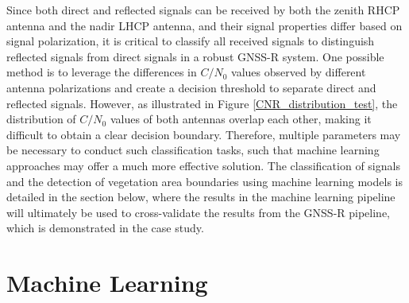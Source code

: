 \documentclass[12pt, a4paper]{article}
\begin{document}
Since both direct and reflected signals can be received by both the zenith RHCP
antenna and the nadir LHCP antenna, and their signal properties differ based on
signal polarization, it is critical to classify all received signals to
distinguish reflected signals from direct signals in a robust GNSS-R system. One
possible method is to leverage the differences in $C/N_0$ values observed by
different antenna polarizations and create a decision threshold to separate
direct and reflected signals. However, as illustrated in Figure
\ref{CNR_distribution_test}, the distribution of $C/N_0$ values of both antennas
overlap each other, making it difficult to obtain a clear decision boundary.
Therefore, multiple parameters may be necessary to conduct such classification
tasks, such that machine learning approaches may offer a much more effective
solution. The classification of signals and the detection of vegetation area
boundaries using machine learning models is detailed in the section below, where
the results in the machine learning pipeline will ultimately be used to
cross-validate the results from the GNSS-R pipeline, which is demonstrated in
the case study.


\section{Machine Learning}
\end{document}

